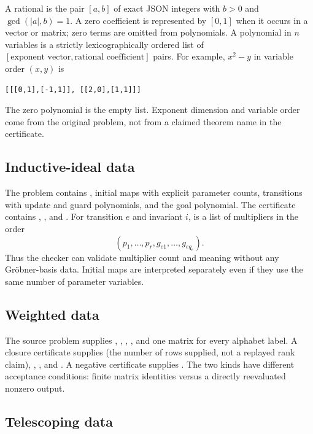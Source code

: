 A rational is the pair $[a,b]$ of exact JSON integers with $b>0$ and
$\gcd(|a|,b)=1$. A zero coefficient is represented by $[0,1]$ when it occurs in
a vector or matrix; zero terms are omitted from polynomials. A polynomial in
$n$ variables is a strictly lexicographically ordered list of
$[\text{exponent vector},\text{rational coefficient}]$ pairs. For example,
$x^2-y$ in variable order $(x,y)$ is
\par\noindent\begin{minipage}{\linewidth}
\begin{lstlisting}
[[[0,1],[-1,1]], [[2,0],[1,1]]]
\end{lstlisting}
\end{minipage}\par
The zero polynomial is the empty list. Exponent dimension and variable order
come from the original problem, not from a claimed theorem name in the
certificate.

\subsection{Inductive-ideal data}

The problem contains , initial maps with explicit parameter
counts, transitions with update and guard polynomials, and the goal polynomial.
The certificate contains , , and
. For transition $e$ and invariant $i$,
 is a list of multipliers in the order
\[
 (p_1,\ldots,p_r,g_{e1},\ldots,g_{eq_e}).
\]
Thus the checker can validate multiplier count and meaning without any
Gr\"obner-basis data. Initial maps are interpreted separately even if they use
the same number of parameter variables.

\subsection{Weighted data}

The source problem supplies , , ,
, and one matrix for every alphabet label. A closure certificate
supplies  (the number of rows supplied, not a replayed rank claim),
, , and . A negative
certificate supplies . The two kinds have different acceptance
conditions: finite matrix identities versus a directly reevaluated nonzero
output.

\subsection{Telescoping data}

